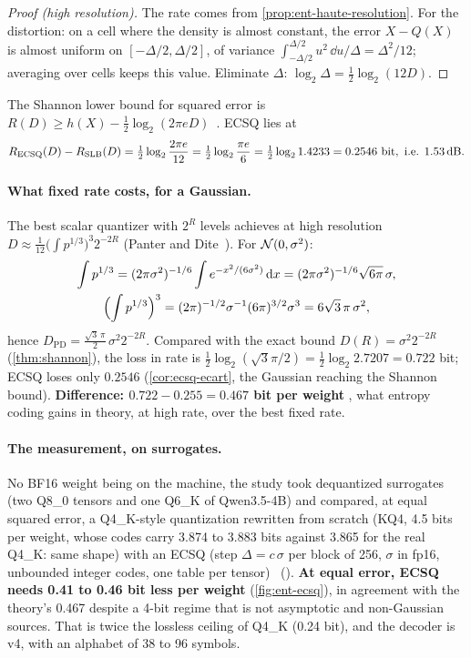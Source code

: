 \begin{proof}[Proof (high resolution)]
The rate comes from \cref{prop:ent-haute-resolution}. For the distortion: on a cell where the density is almost constant, the error $X - Q(X)$ is almost uniform on $[-\Delta/2, \Delta/2]$, of variance $\int_{-\Delta/2}^{\Delta/2} u^2\,\dd u/\Delta = \Delta^2/12$; averaging over cells keeps this value. Eliminate $\Delta$: $\log_2 \Delta = \tfrac12\log_2(12 D)$.
\end{proof}

\begin{corollaire}\label{cor:ecsq-ecart}
The Shannon lower bound for squared error is $R(D) \ge h(X) - \tfrac12\log_2(2\pi e D)$~\cite{cover2006}. ECSQ lies at
\[
R_{\mathrm{ECSQ}}(D) - R_{\mathrm{SLB}}(D) = \tfrac12 \log_2 \frac{2\pi e}{12} = \tfrac12 \log_2 \frac{\pi e}{6} = \tfrac12 \log_2 1.4233 = 0.2546 \text{ bit}, \text{ i.e. } 1.53\text{\,dB}.
\]
\end{corollaire}

\paragraph{What fixed rate costs, for a Gaussian.} The best scalar quantizer with $2^R$ levels achieves at high resolution $D \approx \tfrac1{12}\bigl(\int p^{1/3}\bigr)^3 2^{-2R}$ (Panter and Dite~\cite{panter1951}). For $\mathcal{N}(0, \sigma^2)$:
\begin{gather*}
\int p^{1/3} = (2\pi\sigma^2)^{-1/6} \int e^{-x^2/(6\sigma^2)}\,\mathrm{d} x = (2\pi\sigma^2)^{-1/6}\sqrt{6\pi}\,\sigma, \\
\Bigl(\int p^{1/3}\Bigr)^3 = (2\pi)^{-1/2}\sigma^{-1}(6\pi)^{3/2}\sigma^3 = 6\sqrt3\,\pi\,\sigma^2,
\end{gather*}
hence $D_{\mathrm{PD}} = \tfrac{\sqrt3\,\pi}{2}\,\sigma^2 2^{-2R}$. Compared with the exact bound $D(R) = \sigma^2 2^{-2R}$ (\cref{thm:shannon}), the loss in rate is $\tfrac12\log_2(\sqrt3\pi/2) = \tfrac12\log_2 2.7207 = 0.722$ bit; ECSQ loses only $0.2546$ (\cref{cor:ecsq-ecart}, the Gaussian reaching the Shannon bound). \textbf{Difference: $0.722 - 0.255 = 0.467$ bit per weight} \calc, what entropy coding gains in theory, at high rate, over the best fixed rate.

\paragraph{The measurement, on surrogates.} No BF16 weight being on the machine, the study took dequantized surrogates (two Q8\_0 tensors and one Q6\_K of Qwen3.5-4B) and compared, at equal squared error, a Q4\_K-style quantization rewritten from scratch (KQ4, 4.5 bits per weight, whose codes carry 3.874 to 3.883 bits against 3.865 for the real Q4\_K: same shape) with an ECSQ (step $\Delta = c\,\sigma$ per block of 256, $\sigma$ in fp16, unbounded integer codes, one table per tensor) \mes~(). \textbf{At equal error, ECSQ needs 0.41 to 0.46 bit less per weight} (\cref{fig:ent-ecsq}), in agreement with the theory's 0.467 despite a 4-bit regime that is not asymptotic and non-Gaussian sources. That is twice the lossless ceiling of Q4\_K (0.24 bit), and the decoder is v4, with an alphabet of 38 to 96 symbols.

